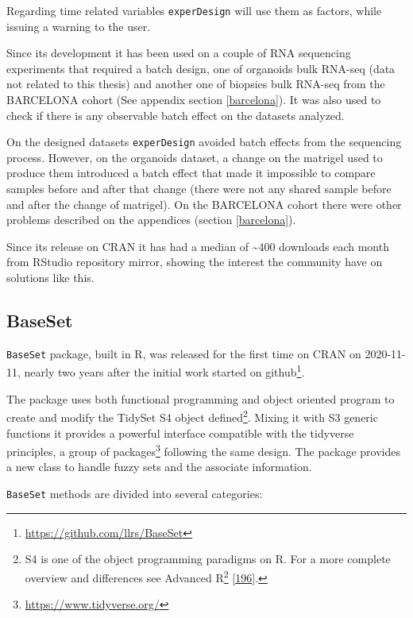 \documentclass[
  a4paper,
]{book}
\DeclareRobustCommand{\href}[2]{#2\footnote{\url{#1}}}
\begin{document}
Regarding time related variables \texttt{experDesign} will use them as factors, while issuing a warning to the user.

Since its development it has been used on a couple of RNA sequencing experiments that required a batch design, one of organoids bulk RNA-seq (data not related to this thesis) and another one of biopsies bulk RNA-seq from the BARCELONA cohort (See appendix section \ref{barcelona}).
It was also used to check if there is any observable batch effect on the datasets analyzed.

On the designed datasets \texttt{experDesign} avoided batch effects from the sequencing process.
However, on the organoids dataset, a change on the matrigel used to produce them introduced a batch effect that made it impossible to compare samples before and after that change (there were not any shared sample before and after the change of matrigel).
On the BARCELONA cohort there were other problems described on the appendices (section \ref{barcelona}).

Since its release on CRAN it has had a median of \textasciitilde400 downloads each month from RStudio repository mirror, showing the interest the community have on solutions like this.

\hypertarget{baseset-1}{%
\subsection{BaseSet}\label{baseset-1}}

\texttt{BaseSet} package, built in R, was released for the first time on CRAN on 2020-11-11, nearly two years after the initial work started on \href{https://github.com/llrs/BaseSet}{github}.

The package uses both functional programming and object oriented program to create and modify the TidySet S4 object defined\footnote{S4 is one of the object programming paradigms on R.
  For a more complete overview and differences see \href{https://adv-r.hadley.nz/oo.html}{Advanced R} {[}\protect\hyperlink{ref-wickham2019}{196}{]}.}.
Mixing it with S3 generic functions it provides a powerful interface compatible with the tidyverse principles, a \href{https://www.tidyverse.org/}{group of packages} following the same design.
The package provides a new class to handle fuzzy sets and the associate information.

\texttt{BaseSet} methods are divided into several categories:
\end{document}

